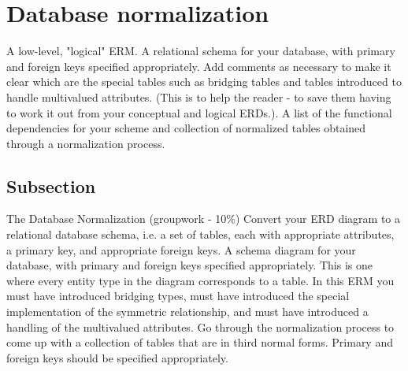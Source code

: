 \section{Database normalization}\label{Section label}
A low-level, "logical" ERM. A relational schema for your database, with primary and foreign keys specified appropriately. Add comments as necessary to make it clear which are the special tables such as bridging tables and tables introduced to handle multivalued attributes. (This is to help the reader - to save them having to work it out from your conceptual and logical ERDs.). A list of the functional dependencies for your scheme and collection of normalized tables obtained through a normalization process.
\subsection{Subsection}\label{subsection}
The Database Normalization (groupwork - 10\%) \newline
Convert your ERD diagram to a relational database schema, i.e. a set of tables, each with appropriate attributes, a primary key, and appropriate foreign keys. A schema diagram for your database, with primary and foreign keys specified appropriately. This is one where every entity type in the diagram corresponds to a table. In this ERM you must have introduced bridging types, must have introduced the special implementation of the symmetric relationship, and must have introduced a handling of the multivalued attributes. Go through the normalization process to come up with a collection of tables that are in third normal forms. Primary and foreign keys should be specified appropriately.